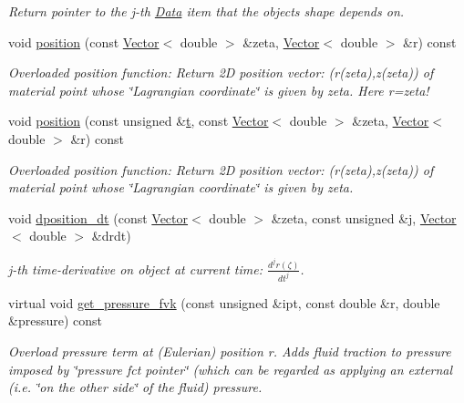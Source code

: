 \begin{DoxyCompactItemize}
\begin{DoxyCompactList}\small\item\em Return pointer to the j-\/th \hyperlink{classoomph_1_1Data}{Data} item that the object\textquotesingle{}s shape depends on. \end{DoxyCompactList}\item 
void \hyperlink{classoomph_1_1FSIAxisymFoepplvonKarmanElement_a9fc819d4f7a036a45bd62a484c9749d7}{position} (const \hyperlink{classoomph_1_1Vector}{Vector}$<$ double $>$ \&zeta, \hyperlink{classoomph_1_1Vector}{Vector}$<$ double $>$ \&r) const
\begin{DoxyCompactList}\small\item\em Overloaded position function\+: Return 2D position vector\+: (r(zeta),z(zeta)) of material point whose \char`\"{}\+Lagrangian coordinate\char`\"{} is given by zeta. Here r=zeta! \end{DoxyCompactList}\item 
void \hyperlink{classoomph_1_1FSIAxisymFoepplvonKarmanElement_a9c86ac02c60541d451ceb50eb49914ed}{position} (const unsigned \&\hyperlink{cfortran_8h_af6f0bd3dc13317f895c91323c25c2b8f}{t}, const \hyperlink{classoomph_1_1Vector}{Vector}$<$ double $>$ \&zeta, \hyperlink{classoomph_1_1Vector}{Vector}$<$ double $>$ \&r) const
\begin{DoxyCompactList}\small\item\em Overloaded position function\+: Return 2D position vector\+: (r(zeta),z(zeta)) of material point whose \char`\"{}\+Lagrangian coordinate\char`\"{} is given by zeta. \end{DoxyCompactList}\item 
void \hyperlink{classoomph_1_1FSIAxisymFoepplvonKarmanElement_a83bf7fe6d4d9dc08400aa853198c716d}{dposition\+\_\+dt} (const \hyperlink{classoomph_1_1Vector}{Vector}$<$ double $>$ \&zeta, const unsigned \&j, \hyperlink{classoomph_1_1Vector}{Vector}$<$ double $>$ \&drdt)
\begin{DoxyCompactList}\small\item\em j-\/th time-\/derivative on object at current time\+: $ \frac{d^{j} r(\zeta)}{dt^j} $. \end{DoxyCompactList}\item 
virtual void \hyperlink{classoomph_1_1FSIAxisymFoepplvonKarmanElement_a96b9277c8b9ff3ca40f25851fa30b34e}{get\+\_\+pressure\+\_\+fvk} (const unsigned \&ipt, const double \&r, double \&pressure) const
\begin{DoxyCompactList}\small\item\em Overload pressure term at (Eulerian) position r. Adds fluid traction to pressure imposed by \char`\"{}pressure fct pointer\char`\"{} (which can be regarded as applying an external (i.\+e. \char`\"{}on the other side\char`\"{} of the fluid) pressure. \end{DoxyCompactList}\item 

\end{DoxyCompactItemize}
